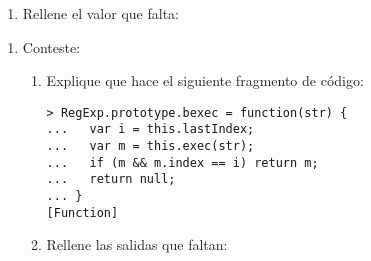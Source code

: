 \begin{enumerate}
\def\labelenumi{\arabic{enumi}.}
\setcounter{enumi}{2}
\itemsep1pt\parskip0pt
\item
  Rellene el valor que falta:
\end{enumerate}

\begin{Shaded}
\begin{Highlighting}[]
\FloatTok{(}\FloatTok{+)(}\FloatTok{)}
\NormalTok{> } \NormalTok{= ________}
\NormalTok{[ }\NormalTok{,}
  \NormalTok{,}
  \NormalTok{,}
  \NormalTok{,}
   \NormalTok{]}
\end{Highlighting}
\end{Shaded}

\begin{enumerate}
\def\labelenumi{\arabic{enumi}.}
\setcounter{enumi}{3}
\item
  Conteste:

  \begin{enumerate}
  \def\labelenumii{\arabic{enumii}.}
  \item
    Explique que hace el siguiente fragmento de código:

\begin{verbatim}
> RegExp.prototype.bexec = function(str) {
...   var i = this.lastIndex;
...   var m = this.exec(str);
...   if (m && m.index == i) return m;
...   return null;
... }
[Function]
\end{verbatim}
  \item
    Rellene las salidas que faltan:
  \end{enumerate}
\end{enumerate}

\begin{Shaded}
\begin{Highlighting}[]
\FloatTok{(}\FloatTok{+)(}\FloatTok{)}
\FloatTok{(}\FloatTok{+)(}\FloatTok{)}
\NormalTok{> } \NormalTok{= }
\NormalTok{> }
\NormalTok{_____________________________________________________}
\NormalTok{> } \NormalTok{= }
\NormalTok{> }
\NormalTok{_____________________________________________________}
\end{Highlighting}
\end{Shaded}

